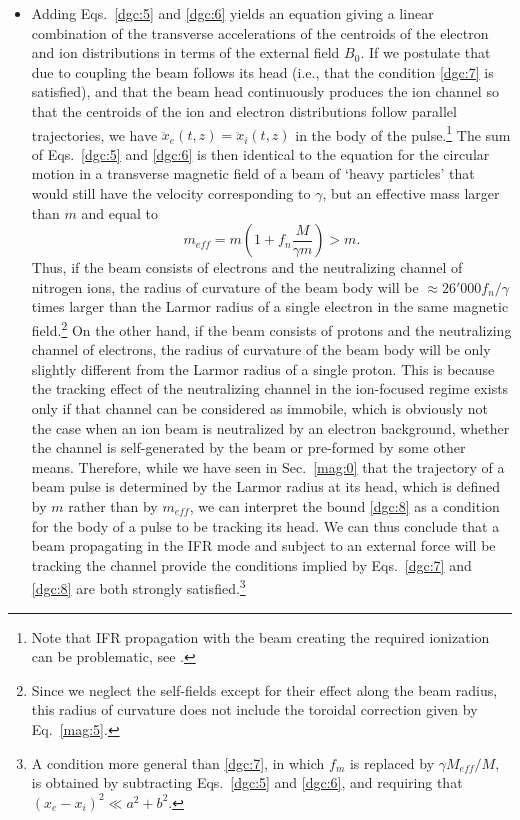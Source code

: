 \documentclass [12pt,a4paper,     ]{report} %
\begin{document}
\begin{itemize}
\item   Adding Eqs.~\eqref{dgc:5} and \eqref{dgc:6} yields an equation giving a linear combination of the transverse accelerations of the centroids of the electron and ion distributions in terms of the external field $B_0$.  If we postulate that due to coupling the beam follows its head (i.e., that the condition \eqref{dgc:7} is satisfied), and that the beam head continuously produces the ion channel so that the centroids of the ion and electron distributions follow parallel trajectories, we have $\ddot{x}_e(t,z)=\ddot{x}_i(t,z)$ in the body of the pulse.\footnote{Note that IFR propagation with the beam creating the required ionization can be problematic, see \cite{SMITH1986-}.}   The sum of Eqs.~\eqref{dgc:5} and \eqref{dgc:6} is then identical to the equation for the circular motion in a transverse magnetic field of a beam of `heavy particles' that would still have the velocity corresponding to $\gamma$, but an effective mass larger than $m$ and equal to
%
\begin{equation}\label{dgc:8} %
          m_{eff} = m (1 + f_n \frac{M}{\gamma m})  >  m.
\end{equation}
%
Thus, if the beam consists of electrons and the neutralizing channel of nitrogen ions, the radius of curvature of the beam body will be $ \approx 26'000 f_n/\gamma$ times larger than the Larmor radius of a single electron in the same magnetic field.\footnote{Since we neglect the self-fields except for their effect along the beam radius, this radius of curvature does not include the toroidal correction given by Eq.~\eqref{mag:5}.}  On the other hand, if the beam consists of protons and the neutralizing channel of electrons, the radius of curvature of the beam body will be only slightly different from the Larmor radius of a single proton.  This is because the tracking effect of the neutralizing channel in the ion-focused regime exists only if that channel can be considered as immobile, which is obviously not the case when an ion beam is neutralized by an electron background, whether the channel is self-generated by the beam or pre-formed by some other means.  Therefore, while we have seen in Sec.~\ref{mag:0} that the trajectory of a beam pulse is determined by the Larmor radius at its head, which is defined by $m$ rather than by $m_{eff}$, we can interpret the bound \eqref{dgc:8} as a condition for the body of a pulse to be tracking its head.  We can thus conclude that a beam propagating in the IFR mode and subject to an external force will be tracking the channel provide the conditions implied by Eqs.~\eqref{dgc:7} and \eqref{dgc:8} are both strongly satisfied.\footnote{A condition more general than \eqref{dgc:7}, in which $f_m$ is replaced by $\gamma M_{eff}/M$, is obtained by subtracting Eqs.~\eqref{dgc:5} and \eqref{dgc:6}, and requiring that $(x_e-x_i)^2 \ll a^2+b^2$.}

\end{itemize}
\end{document}
